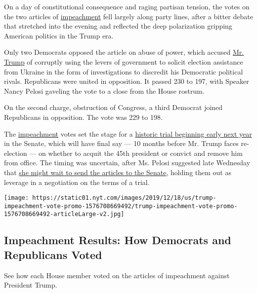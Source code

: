 On a day of constitutional consequence and raging partisan tension, the
votes on the two articles of
\href{https://www.nytimes.com/live/2020/trump-impeachment-01-16}{impeachment}
fell largely along party lines, after a bitter debate that stretched
into the evening and reflected the deep polarization gripping American
politics in the Trump era.

Only two Democrats opposed the article on abuse of power, which accused
\href{https://www.nytimes.com/live/2020/trump-impeachment-01-15}{Mr.
Trump} of corruptly using the levers of government to solicit election
assistance from Ukraine in the form of investigations to discredit his
Democratic political rivals. Republicans were united in opposition. It
passed 230 to 197, with Speaker Nancy Pelosi gaveling the vote to a
close from the House rostrum.

On the second charge, obstruction of Congress, a third Democrat joined
Republicans in opposition. The vote was 229 to 198.

The
\href{https://www.nytimes.com/live/2020/trump-impeachment-01-16}{impeachment}
votes set the stage for a
\href{https://www.nytimes.com/2019/12/18/us/politics/senate-impeachment-trial.html}{historic
trial beginning early next year} in the Senate, which will have final
say --- 10 months before Mr. Trump faces re-election --- on whether to
acquit the 45th president or convict and remove him from office. The
timing was uncertain, after Ms. Pelosi suggested late Wednesday that
\href{https://www.nytimes.com/2019/12/18/us/politics/impeachment-trial.html}{she
might wait to send the articles to the Senate}, holding them out as
leverage in a negotiation on the terms of a trial.

\href{https://www.nytimes.com/interactive/2019/12/18/us/politics/trump-impeachment-vote.html}{}

\texttt{[image: https://static01.nyt.com/images/2019/12/18/us/trump-impeachment-vote-promo-1576708669492/trump-impeachment-vote-promo-1576708669492-articleLarge-v2.jpg]}

\hypertarget{impeachment-results-how-democrats-and-republicans-voted}{%
\subsection{Impeachment Results: How Democrats and Republicans
Voted}\label{impeachment-results-how-democrats-and-republicans-voted}}

See how each House member voted on the articles of impeachment against
President Trump.

